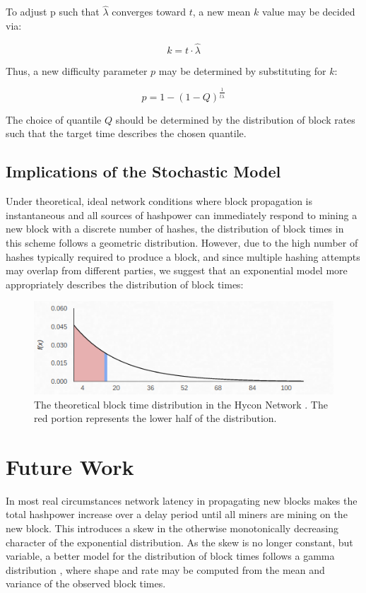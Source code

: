 \documentclass[]{article}
\begin{document}
To adjust p such that $\hat{\lambda}$ converges toward $t$, a new mean $k$ value may be decided via:

\begin{equation}
	k = t \cdot \hat{\lambda}
\end{equation} 

Thus, a new difficulty parameter $p$ may be determined by substituting for $k$: 

\begin{equation}
p = 1 - (1 - Q)^\frac{1}{t \hat{\lambda}} 
\end{equation}

The choice of quantile $Q$ should be determined by the distribution of block rates such that the target time describes the chosen quantile. 

\subsection{Implications of the Stochastic Model}  
Under theoretical, ideal network conditions where block propagation is instantaneous and all sources of hashpower can immediately respond to mining a new block with a discrete number of hashes, the distribution of block times in this scheme follows a geometric distribution.  However, due to the high number of hashes typically required to produce a block, and since multiple hashing attempts may overlap from different parties, we suggest that an exponential model more appropriately describes the distribution of block times: 

\begin{figure}[h]
	\centering
	\includegraphics[width=0.7\linewidth]{"./ideal hycon"}
	\caption{\footnotesize The theoretical block time distribution in the Hycon Network \cite{HyconNetwork}. The red portion represents the lower half of the distribution. \cite{GammaDistHycon}}
\end{figure}

\section{Future Work}
In most real circumstances network latency in propagating new blocks makes the total hashpower increase over a delay period until all miners are mining on the new block.  This introduces a skew in the otherwise monotonically decreasing character of the exponential distribution.  As the skew is no longer constant, but variable, a better model for the distribution of block times follows a gamma distribution \cite{GammaDistDefinition}, where shape and rate may be computed from the mean and variance of the observed block times.  
\end{document}
